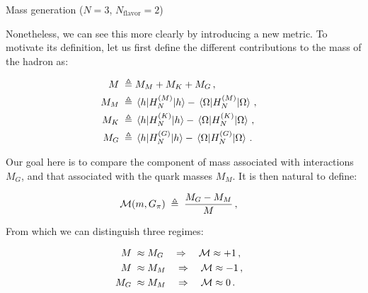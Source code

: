 \begin{frame}[allowframebreaks]{Mass generation ($N=3$, $N_\text{flavor}=2$)}
\break

  Nonetheless, we can see this more clearly by introducing a new metric. To motivate its definition, let us first define the different contributions to the mass of the hadron as:

  \begin{align*}
    M   \;\triangleq\;&
      M_M + M_K + M_G \,,\quad\\
    M_M \;\triangleq\;&
      \mel{h}{H_N^{(M)}}{h} - \mel{\Omega}{H_N^{(M)}}{\Omega} \,,\quad\\
    M_K \;\triangleq\;&
      \mel{h}{H_N^{(K)}}{h} - \mel{\Omega}{H_N^{(K)}}{\Omega} \,,\quad\\
    M_G \;\triangleq\;&
      \mel{h}{H_N^{(G)}}{h} - \mel{\Omega}{H_N^{(G)}}{\Omega} \,.\quad
  \end{align*}

  Our goal here is to compare the component of mass associated with interactions $M_G$, and that associated with the quark masses $M_M$. It is then natural to define:

  \begin{gather*}
    \mathcal{M}(m,G_\pi) \;\triangleq\; \frac{M_G - M_M}{M} \,,\quad
  \end{gather*}

\break

  From which we can distinguish three regimes:

  \begin{align*}
    M   \;\approx\;& M_G \quad \Rightarrow \quad \mathcal{M} \approx +1 \,,\quad\\
    M   \;\approx\;& M_M \quad \Rightarrow \quad \mathcal{M} \approx -1 \,,\quad\\
    M_G \;\approx\;& M_M \quad \Rightarrow \quad \mathcal{M} \approx  0 \,.\quad
  \end{align*}


\end{frame}
